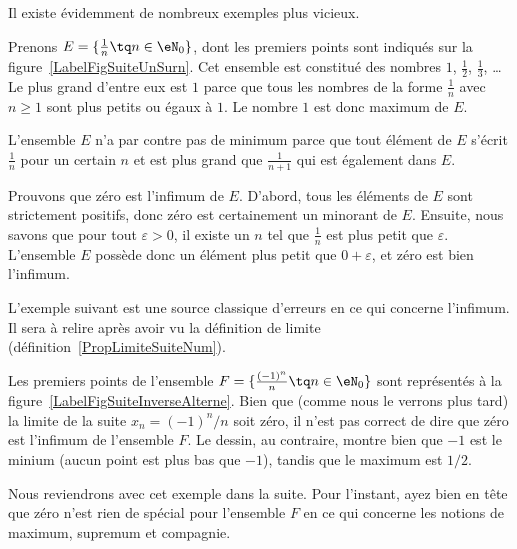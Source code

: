 Il existe évidemment de nombreux exemples plus vicieux.

\begin{example}
	Prenons $E=\{ \frac{1}{ n }\tq n\in\eN_0 \}$, dont les premiers points sont indiqués sur la figure~\ref{LabelFigSuiteUnSurn}. Cet ensemble est constitué des nombres $1$, $\frac{ 1 }{2}$, $\frac{1}{ 3 }$, \ldots Le plus grand d'entre eux est $1$ parce que tous les nombres de la forme $\frac{1}{ n }$ avec $n\geq 1$ sont plus petits ou égaux à $1$. Le nombre $1$ est donc maximum de $E$.

	L'ensemble $E$ n'a par contre pas de minimum parce que tout élément de $E$ s'écrit $\frac{1}{ n }$ pour un certain $n$ et est plus grand que $\frac{1}{ n+1 }$ qui est également dans $E$.

	Prouvons que zéro est l'infimum de $E$. D'abord, tous les éléments de $E$ sont strictement positifs, donc zéro est certainement un minorant de $E$. Ensuite, nous savons que pour tout $\varepsilon>0$, il existe un $n$ tel que $\frac{1}{ n }$ est plus petit que $\varepsilon$. L'ensemble $E$ possède donc un élément plus petit que $0+\varepsilon$, et zéro est bien l'infimum.
\end{example}

\newcommand{\CaptionFigSuiteUnSurn}{Les premiers points du type $x_n=1/n$.}


L'exemple suivant est une source classique d'erreurs en ce qui concerne l'infimum. Il sera à relire après avoir vu la définition de limite (définition~\ref{PropLimiteSuiteNum}).

\begin{example}
	Les premiers points de l'ensemble $F=\{ \frac{ (-1)^n }{ n }\tq n\in\eN_0 \}$ sont représentés à la figure~\ref{LabelFigSuiteInverseAlterne}. Bien que (comme nous le verrons plus tard) la limite de la suite $x_n=(-1)^n/n$ soit zéro, il n'est pas correct de dire que zéro est l'infimum de l'ensemble $F$. Le dessin, au contraire, montre bien que $-1$ est le minium (aucun point est plus bas que $-1$), tandis que le maximum est $1/2$.

	Nous reviendrons avec cet exemple dans la suite. Pour l'instant, ayez bien en tête que zéro n'est rien de spécial pour l'ensemble $F$ en ce qui concerne les notions de maximum, supremum et compagnie.
\end{example}
\newcommand{\CaptionFigSuiteInverseAlterne}{Les quelques premiers points du type $(-1)^n/n$.}


